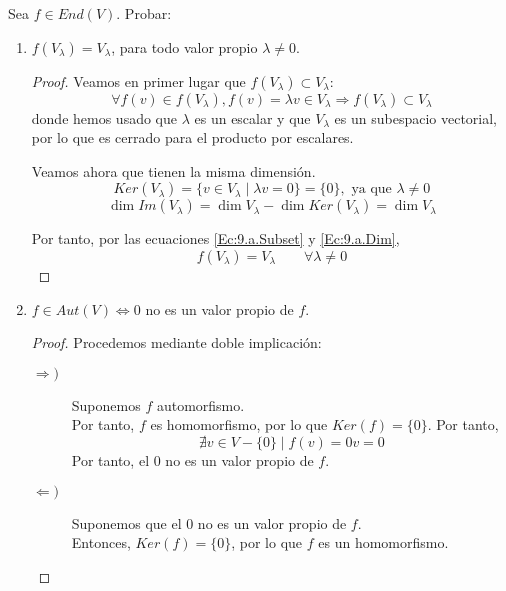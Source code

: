 \begin{ejercicio}
    Sea $f\in End(V)$. Probar:
    \begin{enumerate}
        \item $f(V_\lambda) = V_\lambda$, para todo valor propio $\lambda\neq 0$.
        \begin{proof}
            Veamos en primer lugar que $f(V_\lambda) \subset V_\lambda$:
            \begin{equation}\label{Ec:9.a.Subset}
                \forall f(v) \in f(V_\lambda), f(v) = \lambda v \in V_\lambda \Longrightarrow f(V_\lambda) \subset V_\lambda
            \end{equation}
            donde hemos usado que $\lambda$ es un escalar y que $V_\lambda$ es un subespacio vectorial, por lo que es cerrado para el producto por escalares.
    
            Veamos ahora que tienen la misma dimensión.
            $$Ker(V_\lambda) = \{v\in V_\lambda \mid \lambda v = 0\} = \{0\},\text{ ya que } \lambda \neq 0$$
            \begin{equation}\label{Ec:9.a.Dim}
                \dim Im(V_\lambda) = \dim V_\lambda - \dim Ker(V_\lambda) = \dim V_\lambda
            \end{equation}
    
            Por tanto, por las ecuaciones \ref{Ec:9.a.Subset} y \ref{Ec:9.a.Dim},
            $$f(V_\lambda) = V_\lambda \qquad \forall \lambda\neq 0$$
        \end{proof}

        \item $f \in Aut(V) \Longleftrightarrow 0$ no es un valor propio de $f$.
        \begin{proof} Procedemos mediante doble implicación:
            \begin{description}
                \item [$\Longrightarrow )$] Suponemos $f$ automorfismo.\\
                Por tanto, $f$ es homomorfismo, por lo que $Ker(f) = \{0\}$.
                Por tanto,
                $$\nexists v \in V-\{0\} \mid f(v) = 0v = 0$$
                Por tanto, el $0$ no es un valor propio de $f$.

                \item [$\Longleftarrow )$] Suponemos que el 0 no es un valor propio de $f$.\\
                Entonces, $Ker(f) = \{0\}$, por lo que $f$ es un homomorfismo.


\end{description}
\end{proof}
\end{enumerate}
\end{ejercicio}
